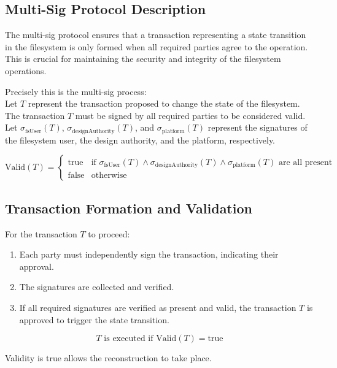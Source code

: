 \documentclass{tufte-handout}
\begin{document}
\subsection*{Multi-Sig Protocol Description}
The multi-sig protocol ensures that a transaction representing a state transition in the filesystem is only formed when all required parties agree to the operation.
This is crucial for maintaining the security and integrity of the filesystem operations.\\
\vspace{10pt}

Precisely this is the multi-sig process:\\
\vspace{10pt}
Let \( T \) represent the transaction proposed to change the state of the filesystem. The transaction \( T \) must be signed by all required parties to be considered valid. Let \( \sigma_{\text{fsUser}}(T) \), \( \sigma_{\text{designAuthority}}(T) \), and \( \sigma_{\text{platform}}(T) \) represent the signatures of the filesystem user, the design authority, and the platform, respectively.

\[
\text{Valid}(T) = \begin{cases} 
\text{true} & \text{if } \sigma_{\text{fsUser}}(T) \land \sigma_{\text{designAuthority}}(T) \land \sigma_{\text{platform}}(T) \text{ are all present} \\
\text{false} & \text{otherwise}
\end{cases}
\]

\subsection*{Transaction Formation and Validation}
For the transaction \( T \) to proceed:
\begin{enumerate}
    \item Each party must independently sign the transaction, indicating their approval.
    \item The signatures are collected and verified.
    \item If all required signatures are verified as present and valid, the transaction \( T \) is approved to trigger the state transition.
\end{enumerate}

\[
T \text{ is executed if } \text{Valid}(T) = \text{true}
\]

Validity is true allows the reconstruction to take place.
\end{document}
